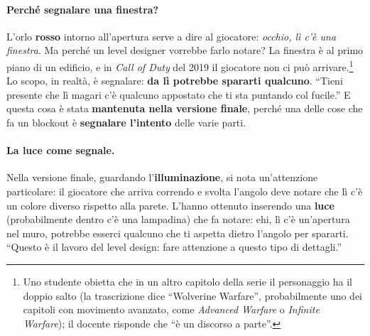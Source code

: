 \paragraph{Perché segnalare una finestra?} L'orlo \textbf{rosso} intorno
all'apertura serve a dire al giocatore: \emph{occhio, lì c'è una finestra}. Ma
perché un level designer vorrebbe farlo notare? La finestra è al primo piano di
un edificio, e in \emph{Call of Duty} del 2019 il giocatore non ci può
arrivare.\footnote{Uno studente obietta che in un altro capitolo della serie il
personaggio ha il doppio salto (la trascrizione dice ``Wolverine Warfare'',
probabilmente uno dei capitoli con movimento avanzato, come \emph{Advanced
Warfare} o \emph{Infinite Warfare}); il docente risponde che ``è un discorso a
parte''.} Lo scopo, in realtà, è segnalare: \textbf{da lì potrebbe spararti
qualcuno}. ``Tieni presente che lì magari c'è qualcuno appostato che ti sta
puntando col fucile.'' E questa cosa è stata \textbf{mantenuta nella versione
finale}, perché una delle cose che fa un blockout è \textbf{segnalare
l'intento} delle varie parti.

\paragraph{La luce come segnale.} Nella versione finale, guardando
l'\textbf{illuminazione}, si nota un'attenzione particolare: il giocatore che
arriva correndo e svolta l'angolo deve notare che lì c'è un colore diverso
rispetto alla parete. L'hanno ottenuto inserendo una \textbf{luce}
(probabilmente dentro c'è una lampadina) che fa notare: ehi, lì c'è
un'apertura nel muro, potrebbe esserci qualcuno che ti aspetta dietro l'angolo
per spararti. ``Questo è il lavoro del level design: fare attenzione a questo
tipo di dettagli.''

